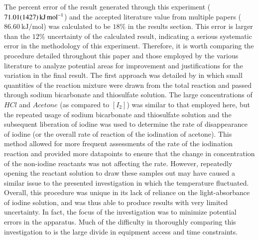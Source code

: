 The percent error of the result generated through this experiment ($\SI{71.01\pm14.27}{\kilo\joule\per\mole}$) and the accepted literature value from multiple papers ($\SI{86.60}{\kilo\joule\per\mole}$) was calculated to be $18\%$ in the results section. This error is larger than the $12\%$ uncertainty of the calculated result, indicating a serious systematic error in the methodology of this experiment. Therefore, it is worth comparing the procedure detailed throughout this paper and those employed by the various literature to analyze potential areas for improvement and justifications for the variation in the final result. The first approach was detailed by \textcite{other_literature_1} in which small quantities of the reaction mixture were drawn from the total reaction and passed through sodium bicarbonate and thiosulfate solution. The large concentrations of $HCl$ and $Acetone$ (as compared to $[I_2]$) was similar to that employed here, but the repeated usage of sodium bicarbonate and thiosulfate solution and the subsequent liberation of iodine was used to determine the rate of disappearance of iodine (or the overall rate of reaction of the iodination of acetone). This method allowed for more frequent assessments of the rate of the iodination reaction and provided more datapoints to ensure that the change in concentration of the non-iodine reactants was not affecting the rate. However, repeatedly opening the reactant solution to draw these samples out may have caused a similar issue to the presented investigation in which the temperature fluctuated. Overall, this procedure was unique in its lack of reliance on the light-absorbance of iodine solution, and was thus able to produce results with very limited uncertainty. In fact, the focus of the investigation was to minimize potential errors in the apparatus. Much of the difficulty in thoroughly comparing this investigation to \textcite{other_literature_1} is the large divide in equipment access and time constraints.


